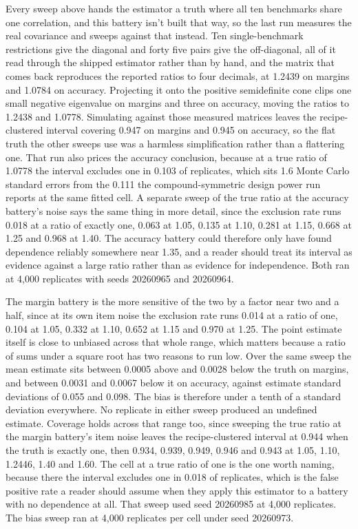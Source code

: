 Every sweep above hands the estimator a truth where all ten benchmarks share one correlation, and this battery isn't built that way, so the last run measures the real covariance and sweeps against that instead. Ten single-benchmark restrictions give the diagonal and forty five pairs give the off-diagonal, all of it read through the shipped estimator rather than by hand, and the matrix that comes back reproduces the reported ratios to four decimals, at 1.2439 on margins and 1.0784 on accuracy. Projecting it onto the positive semidefinite cone clips one small negative eigenvalue on margins and three on accuracy, moving the ratios to 1.2438 and 1.0778. Simulating against those measured matrices leaves the recipe-clustered interval covering 0.947 on margins and 0.945 on accuracy, so the flat truth the other sweeps use was a harmless simplification rather than a flattering one. That run also prices the accuracy conclusion, because at a true ratio of 1.0778 the interval excludes one in 0.103 of replicates, which sits 1.6 Monte Carlo standard errors from the 0.111 the compound-symmetric design power run reports at the same fitted cell. A separate sweep of the true ratio at the accuracy battery's noise says the same thing in more detail, since the exclusion rate runs 0.018 at a ratio of exactly one, 0.063 at 1.05, 0.135 at 1.10, 0.281 at 1.15, 0.668 at 1.25 and 0.968 at 1.40. The accuracy battery could therefore only have found dependence reliably somewhere near 1.35, and a reader should treat its interval as evidence against a large ratio rather than as evidence for independence. Both ran at 4,000 replicates with seeds 20260965 and 20260964.

The margin battery is the more sensitive of the two by a factor near two and a half, since at its own item noise the exclusion rate runs 0.014 at a ratio of one, 0.104 at 1.05, 0.332 at 1.10, 0.652 at 1.15 and 0.970 at 1.25. The point estimate itself is close to unbiased across that whole range, which matters because a ratio of sums under a square root has two reasons to run low. Over the same sweep the mean estimate sits between 0.0005 above and 0.0028 below the truth on margins, and between 0.0031 and 0.0067 below it on accuracy, against estimate standard deviations of 0.055 and 0.098. The bias is therefore under a tenth of a standard deviation everywhere. No replicate in either sweep produced an undefined estimate. Coverage holds across that range too, since sweeping the true ratio at the margin battery's item noise leaves the recipe-clustered interval at 0.944 when the truth is exactly one, then 0.934, 0.939, 0.949, 0.946 and 0.943 at 1.05, 1.10, 1.2446, 1.40 and 1.60. The cell at a true ratio of one is the one worth naming, because there the interval excludes one in 0.018 of replicates, which is the false positive rate a reader should assume when they apply this estimator to a battery with no dependence at all. That sweep used seed 20260985 at 4,000 replicates. The bias sweep ran at 4,000 replicates per cell under seed 20260973.

